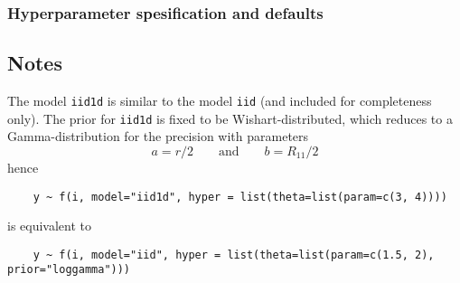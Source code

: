 \documentclass[a4paper,11pt]{article}
\begin{document}
\subsubsection*{Hyperparameter spesification and defaults}



\subsection*{Notes}

The model \texttt{iid1d} is similar to the model \texttt{iid} (and
included for completeness only). The prior for \texttt{iid1d} is fixed
to be Wishart-distributed, which reduces to a Gamma-distribution for
the precision with parameters
\begin{displaymath}
    a = r/2 \qquad\text{and}\qquad b = R_{11}/2
\end{displaymath}
hence
\begin{verbatim}
    y ~ f(i, model="iid1d", hyper = list(theta=list(param=c(3, 4))))
\end{verbatim}
is equivalent to
\begin{verbatim}
    y ~ f(i, model="iid", hyper = list(theta=list(param=c(1.5, 2), prior="loggamma")))
\end{verbatim}
\end{document}
